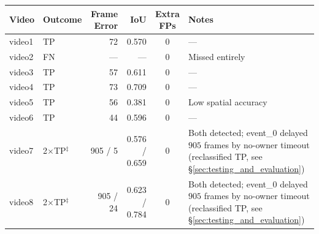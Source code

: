 \begin{table}[!htbp]
	\centering
	\small
	\begin{tabularx}{\textwidth}{l l r r c >{\raggedright\arraybackslash}X}
		\toprule
		\textbf{Video} & \textbf{Outcome}         & \textbf{Frame Error} & \textbf{IoU}  & \textbf{Extra FPs} & \textbf{Notes}                                                                                                             \\
		\midrule
		video1         & TP                       & 72                   & 0.570         & 0                  & ---                                                                                                                        \\
		\addlinespace
		video2         & FN                       & ---                  & ---           & 0                  & Missed entirely                                                                                                            \\
		\addlinespace
		video3         & TP                       & 57                   & 0.611         & 0                  & ---                                                                                                                        \\
		\addlinespace
		video4         & TP                       & 73                   & 0.709         & 0                  & ---                                                                                                                        \\
		\addlinespace
		video5         & TP                       & 56                   & 0.381         & 0                  & Low spatial accuracy                                                                                                       \\
		\addlinespace
		video6         & TP                       & 44                   & 0.596         & 0                  & ---                                                                                                                        \\
		\addlinespace
		video7         & 2$\times$TP$^{\ddagger}$ & 905 / 5              & 0.576 / 0.659 & 0                  & Both detected; event\_0 delayed $905$ frames by no-owner timeout (reclassified TP, see \S\ref{sec:testing_and_evaluation}) \\
		\addlinespace
		video8         & 2$\times$TP$^{\ddagger}$ & 905 / 24             & 0.623 / 0.784 & 0                  & Both detected; event\_0 delayed $905$ frames by no-owner timeout (reclassified TP, see \S\ref{sec:testing_and_evaluation}) \\

\end{tabularx}
\end{table}
